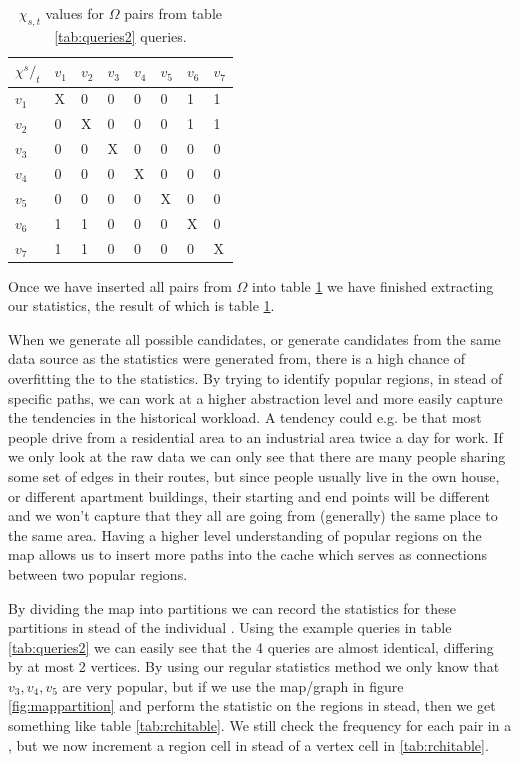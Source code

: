 \begin{table}
\center
\begin{tabular}{|l||l|l|l|l|l|l|l|}
\textbf{$\chi {^s/_t}$}	& $v_1$	& $v_2$	& $v_3$	& $v_4$	& $v_5$	& $v_6$	& $v_7$ \\\hline
$v_1$			& X	& 0	& 0	& 0	& 0	& 1	& 1	 \\
$v_2$			& 0	& X	& 0	& 0	& 0	& 1	& 1	 \\
$v_3$			& 0	& 0	& X	& 0	& 0	& 0	& 0	 \\
$v_4$			& 0	& 0	& 0	& X	& 0	& 0	& 0	 \\
$v_5$			& 0	& 0	& 0	& 0	& X	& 0	& 0	 \\
$v_6$			& 1	& 1	& 0	& 0	& 0	& X	& 0	 \\
$v_7$			& 1	& 1	& 0	& 0	& 0	& 0	& X	 \\\hline
\end{tabular}
\caption{$\chi_{s,t}$ values for $\Omega$ pairs from table \ref{tab:queries2} queries.}
\label{tab:chiex}
\end{table}


Once we have inserted all pairs from $\Omega$ into table \ref{tab:chiex} we have finished extracting our statistics, the result of which is table \ref{tab:chiex}.




When we generate all possible \spath candidates, or generate \spath candidates from the same data source as the statistics were generated from, there is a high chance of overfitting the \spaths to the statistics. By trying to identify popular regions, in stead of specific paths, we can work at a higher abstraction level and more easily capture the tendencies in the historical workload. A tendency could e.g. be that most people drive from a residential area to an industrial area twice a day for work. If we only look at the raw data we can only see that there are many people sharing some set of edges in their routes, but since people usually live in the own house, or different apartment buildings, their starting and end points will be different and we won't capture that they all are going from (generally) the same place to the same area. Having a higher level understanding of popular regions on the map allows us to insert more paths into the cache which serves as connections between two popular regions.

By dividing the map into partitions we can record the statistics for these partitions in stead of the individual \spathsns. Using the example queries in table \ref{tab:queries2} we can easily see that the 4 queries are almost identical, differing by at most 2 vertices. By using our regular statistics method we only know that $v_3,v_4,v_5$ are very popular, but if we use the map/graph in figure \ref{fig:mappartition} and perform the statistic on the regions in stead, then we get something like table \ref{tab:rchitable}. We still check the frequency for each pair in a 
\spathns, but we now increment a region cell in stead of a vertex cell in \ref{tab:rchitable}. 



